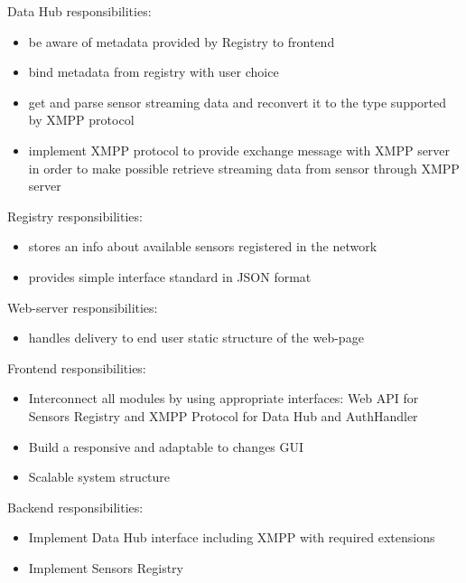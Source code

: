   Data Hub responsibilities:
  \begin{itemize}
  \item be aware of metadata provided by Registry to frontend
  \item bind metadata from registry with user choice
  \item get and parse sensor streaming data and reconvert it to the type supported by XMPP protocol
  \item implement XMPP protocol to provide exchange message with XMPP server in order to make possible retrieve streaming data from sensor through XMPP server
  \end{itemize}
  Registry responsibilities:
  \begin{itemize}
  \item stores an info about available sensors registered in the network
  \item provides simple interface standard in JSON format
  \end{itemize}
  Web-server responsibilities:
  \begin{itemize}
  \item handles delivery to end user static structure of the web-page
  \end{itemize}
  Frontend responsibilities:
  \begin{itemize}
  \item Interconnect all modules by using appropriate interfaces: Web API for Sensors Registry and XMPP Protocol for Data Hub and AuthHandler
  \item Build a responsive and adaptable to changes GUI
  \item Scalable system structure
  \end{itemize}
    Backend responsibilities:
  \begin{itemize}
  \item Implement Data Hub interface including XMPP with required extensions
  \item Implement Sensors Registry
  \end{itemize}